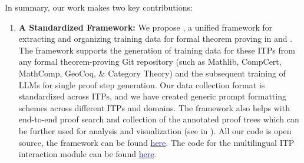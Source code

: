 In summary, our work makes two key contributions:
\begin{enumerate}

\item \textbf{A Standardized Framework:} 
We propose \proofwala, a unified framework for extracting and organizing training data for formal theorem proving in \lean\; and \coq. The framework supports the generation of training data for these ITPs from any formal theorem-proving Git repository (such as Mathlib, CompCert, MathComp, GeoCoq, \& Category Theory) and the subsequent training of LLMs for single proof step generation. Our data collection format is standardized across ITPs, and we have created generic prompt formatting schemes across different ITPs and domains. The framework also helps with end-to-end proof search and collection of the annotated proof trees which can be further used for analysis and visualization (see  in ). All our code is open source, the \name{} framework can be found \href{https://github.com/trishullab/proof-wala}{\textcolor{blue}{here}}. The code for the multilingual ITP interaction module can be found \href{https://github.com/trishullab/itp-interface}{\textcolor{blue}{here}}.



\end{enumerate}
